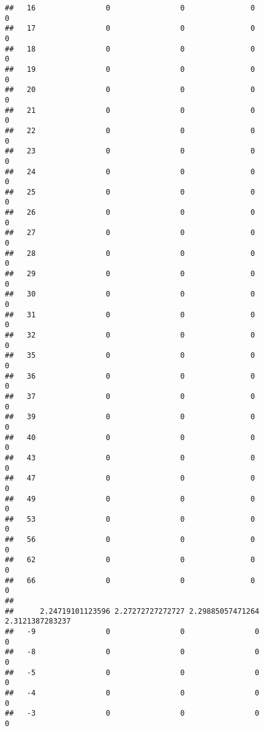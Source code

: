 \documentclass[]{article}
\begin{document}
\begin{verbatim}
##   16                0                0               0                0
##   17                0                0               0                0
##   18                0                0               0                0
##   19                0                0               0                0
##   20                0                0               0                0
##   21                0                0               0                0
##   22                0                0               0                0
##   23                0                0               0                0
##   24                0                0               0                0
##   25                0                0               0                0
##   26                0                0               0                0
##   27                0                0               0                0
##   28                0                0               0                0
##   29                0                0               0                0
##   30                0                0               0                0
##   31                0                0               0                0
##   32                0                0               0                0
##   35                0                0               0                0
##   36                0                0               0                0
##   37                0                0               0                0
##   39                0                0               0                0
##   40                0                0               0                0
##   43                0                0               0                0
##   47                0                0               0                0
##   49                0                0               0                0
##   53                0                0               0                0
##   56                0                0               0                0
##   62                0                0               0                0
##   66                0                0               0                0
##     
##      2.24719101123596 2.27272727272727 2.29885057471264 2.3121387283237
##   -9                0                0                0               0
##   -8                0                0                0               0
##   -5                0                0                0               0
##   -4                0                0                0               0
##   -3                0                0                0               0

\end{verbatim}
\end{document}
